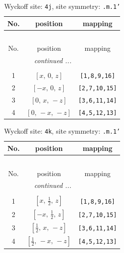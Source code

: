 \documentclass[fleqn,8pt]{jsarticle}
\begin{document}
\renewcommand{\arraystretch}{1.2}
\begin{longtable}{ccc}
\caption{Wyckoff site: {\tt 4j}, site symmetry: {\tt .m.1'}}
 \\
 \hline \hline
No. & position & mapping \\ \hline \endfirsthead

\multicolumn{2}{l}{\tablename\ \thetable{}} \\
 \hline \hline
No. & position & mapping \\ \hline \endhead

 \hline \hline
\multicolumn{2}{r}{\footnotesize\it continued ...} \\ \endfoot

 \hline \hline
\multicolumn{2}{r}{} \\ \endlastfoot

1 & $\left[ x,\, 0,\, z \right]$ & {\tt [1,8,9,16]} \\ \hline
2 & $\left[ - x,\, 0,\, z \right]$ & {\tt [2,7,10,15]} \\ \hline
3 & $\left[ 0,\, x,\, - z \right]$ & {\tt [3,6,11,14]} \\ \hline
4 & $\left[ 0,\, - x,\, - z \right]$ & {\tt [4,5,12,13]} \\
\end{longtable}
\renewcommand{\arraystretch}{1.2}
\begin{longtable}{ccc}
\caption{Wyckoff site: {\tt 4k}, site symmetry: {\tt .m.1'}}
 \\
 \hline \hline
No. & position & mapping \\ \hline \endfirsthead

\multicolumn{2}{l}{\tablename\ \thetable{}} \\
 \hline \hline
No. & position & mapping \\ \hline \endhead

 \hline \hline
\multicolumn{2}{r}{\footnotesize\it continued ...} \\ \endfoot

 \hline \hline
\multicolumn{2}{r}{} \\ \endlastfoot

1 & $\left[ x,\, \frac{1}{2},\, z \right]$ & {\tt [1,8,9,16]} \\ \hline
2 & $\left[ - x,\, \frac{1}{2},\, z \right]$ & {\tt [2,7,10,15]} \\ \hline
3 & $\left[ \frac{1}{2},\, x,\, - z \right]$ & {\tt [3,6,11,14]} \\ \hline
4 & $\left[ \frac{1}{2},\, - x,\, - z \right]$ & {\tt [4,5,12,13]} \\
\end{longtable}
\end{document}
